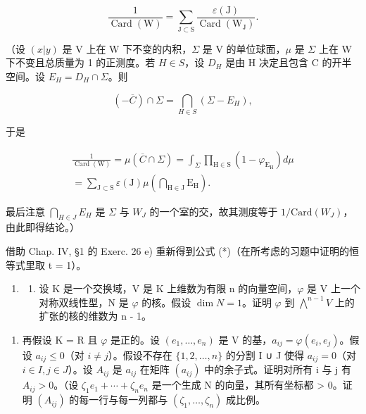 \[
\frac {1}{\operatorname{Card} (\mathrm{W})} = \sum_ {\mathrm{J} \subset \mathrm{S}} \frac {\varepsilon (\mathrm{J})}{\operatorname{Card} (\mathrm{W} _ {\mathrm{J}})}.\tag{(*)}
\]

（设 \((x|y)\) 是 V 上在 W 下不变的内积，\(\Sigma\) 是 V 的单位球面，\(\mu\) 是 \(\Sigma\) 上在 W 下不变且总质量为 1 的正测度。若 \(H \in S\)，设 \(D_{H}\) 是由 H 决定且包含 C 的开半空间。设 \(E_{H} = D_{H} \cap \Sigma\)。则

\[
(- \overline {{C}}) \cap \Sigma = \bigcap_ {H \in S} (\Sigma - E _ {H}),
\]

于是

\[
\begin{array}{l} \frac {1}{\operatorname{Card} (\mathrm{W})} = \mu (\overline {{C}} \cap \Sigma) = \int_ {\Sigma} \prod_ {\mathrm{H} \in \mathrm{S}} (1 - \varphi_ {\mathrm{E} _ {\mathrm{H}}}) d \mu \\ = \sum_ {\mathrm{J} \subset \mathrm{S}} \varepsilon (\mathrm{J}) \mu \left(\bigcap_ {\mathrm{H} \in \mathrm{J}} \mathrm{E} _ {\mathrm{H}}\right). \end{array}
\]

最后注意 \(\bigcap_{H\in J}E_H\) 是 \(\Sigma\) 与 \(W_J\) 的一个室的交，故其测度等于 \(1 / \mathrm{Card}(W_J)\)，由此即得结论。）

借助 Chap. IV, §1 的 Exerc. 26 e) 重新得到公式 (*)（在所考虑的习题中证明的恒等式里取 t = 1）。

\begin{enumerate}
\def\labelenumi{\arabic{enumi})}
\setcounter{enumi}{5}
\tightlist
\item
  \begin{enumerate}
  \def\labelenumii{\alph{enumii})}
  \tightlist
  \item
    设 K 是一个交换域，V 是 K 上维数为有限 n 的向量空间，\(\varphi\) 是 V 上一个对称双线性型，N 是 \(\varphi\) 的核。假设 \(\dim N = 1\)。证明 \(\varphi\) 到 \(\bigwedge^{n-1} V\) 上的扩张的核的维数为 n - 1。
  \end{enumerate}
\end{enumerate}

\begin{enumerate}
\def\labelenumi{\alph{enumi})}
\setcounter{enumi}{1}
\tightlist
\item
  再假设 K = R 且 \(\varphi\) 是正的。设 \((e_{1},\ldots,e_{n})\) 是 V 的基，\(a_{ij} = \varphi(e_{i},e_{j})\)。假设 \(a_{ij} \leqslant 0\)（对 \(i \neq j\)）。假设不存在 \(\{1,2,\ldots,n\}\) 的分割 I ∪ J 使得 \(a_{ij} = 0\)（对 \(i \in I, j \in J\)）。设 \(A_{ij}\) 是 \(a_{ij}\) 在矩阵 \((a_{ij})\) 中的余子式。证明对所有 i 与 j 有 \(A_{ij} > 0\)。（设 \(\zeta_{1}e_{1} + \cdots + \zeta_{n}e_{n}\) 是一个生成 N 的向量，其所有坐标都 \textgreater{} 0。证明 \((A_{ij})\) 的每一行与每一列都与 \((\zeta_{1},\ldots,\zeta_{n})\) 成比例。
\end{enumerate}

